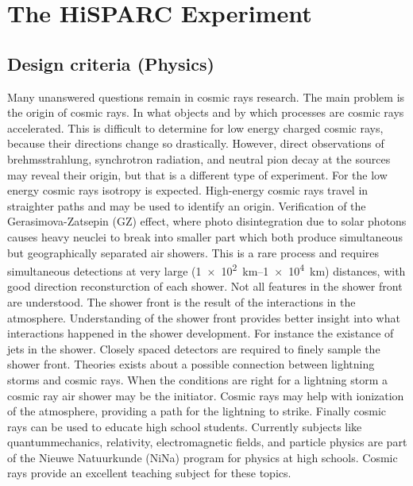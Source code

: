 \chapter{The HiSPARC Experiment}

\section{Design criteria (Physics)}


Many unanswered questions remain in cosmic rays research. The main problem is the origin of cosmic rays. In what objects and by which processes are cosmic rays accelerated. This is difficult to determine for low energy charged cosmic rays, because their directions change so drastically. However, direct observations of brehmsstrahlung, synchrotron radiation, and neutral pion decay at the sources may reveal their origin, but that is a different type of experiment. For the low energy cosmic rays isotropy is expected. High-energy cosmic rays travel in straighter paths and may be used to identify an origin. Verification of the  Gerasimova-Zatsepin (GZ) effect, where photo disintegration due to solar photons causes heavy neuclei to break into smaller part which both produce simultaneous but geographically separated air showers. This is a rare process and requires simultaneous detections at very large (\SIrange{1e2}{1e4}{\kilo\meter}) distances, with good direction reconsturction of each shower. Not all features in the shower front are understood. The shower front is the result of the interactions in the atmosphere. Understanding of the shower front provides better insight into what interactions happened in the shower development. For instance the existance of jets in the shower. Closely spaced detectors are required to finely sample the shower front. Theories exists about a possible connection between lightning storms and cosmic rays. When the conditions are right for a lightning storm a cosmic ray air shower may be the initiator. Cosmic rays may help with ionization of the atmosphere, providing a path for the lightning to strike. Finally cosmic rays can be used to educate high school students. Currently subjects like quantummechanics, relativity, electromagnetic fields, and particle physics are part of the Nieuwe Natuurkunde (NiNa) program for physics at high schools. Cosmic rays provide an excellent teaching subject for these topics.

